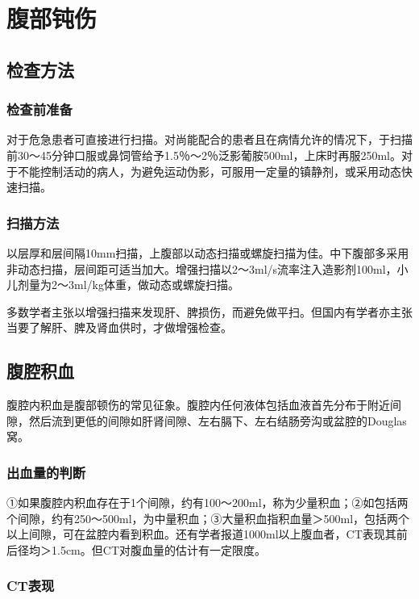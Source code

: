 \chapter{腹部钝伤}

\section{检查方法}

\subsection{检查前准备}

对于危急患者可直接进行扫描。对尚能配合的患者且在病情允许的情况下，于扫描前30～45分钟口服或鼻饲管给予1.5％～2％泛影葡胺500ml，上床时再服250ml。对于不能控制活动的病人，为避免运动伪影，可服用一定量的镇静剂，或采用动态快速扫描。

\subsection{扫描方法}

以层厚和层间隔10mm扫描，上腹部以动态扫描或螺旋扫描为佳。中下腹部多采用非动态扫描，层间距可适当加大。增强扫描以2～3ml/s流率注入造影剂100ml，小儿剂量为2～3ml/kg体重，做动态或螺旋扫描。

多数学者主张以增强扫描来发现肝、脾损伤，而避免做平扫。但国内有学者亦主张当要了解肝、脾及肾血供时，才做增强检查。

\section{腹腔积血}

腹腔内积血是腹部顿伤的常见征象。腹腔内任何液体包括血液首先分布于附近间隙，然后流到更低的间隙如肝肾间隙、左右膈下、左右结肠旁沟或盆腔的Douglas窝。

\subsection{出血量的判断}

①如果腹腔内积血存在于1个间隙，约有100～200ml，称为少量积血；②如包括两个间隙，约有250～500ml，为中量积血；③大量积血指积血量＞500ml，包括两个以上间隙，可在盆腔内看到积血。还有学者报道1000ml以上腹血者，CT表现其前后径均＞1.5cm。但CT对腹血量的估计有一定限度。

\subsection{CT表现}

